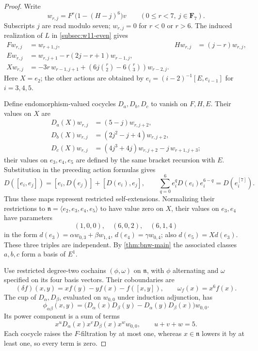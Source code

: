 \documentclass[11pt,reqno]{amsart}
\theoremstyle{definition}
\theoremstyle{remark}
\theoremstyle{definition}
\begin{document}
\begin{proof}
Write
\[
 w_{r,j}=F^r\bigl(1-(H-j)^6\bigr)v\qquad
 (0\le r<7,\ j\in\mathbf F_7).
\]
Subscripts $j$ are read modulo seven; $w_{r,j}=0$ for $r<0$ or $r>6$.
The induced realization of $L$ in \cref{subsec:w11-even} gives
\[
\begin{aligned}
 Fw_{r,j}&=w_{r+1,j},&
 Hw_{r,j}&=(j-r)w_{r,j},\\
 Ew_{r,j}&=w_{r,j+1}-r(2j-r+1)w_{r-1,j},\\
 Xw_{r,j}&=-3r\,w_{r-1,j+1}
 +\left(6j\binom r2-6\binom r3\right)w_{r-2,j}.
\end{aligned}
\]
Here $X=e_2$; the other actions are obtained by
$e_i=(i-2)^{-1}[E,e_{i-1}]$ for $i=3,4,5$.

Define endomorphism-valued cocycles $D_a,D_b,D_c$ to vanish on
$F,H,E$. Their values on $X$ are
\[
\begin{aligned}
 D_a(X)w_{r,j}&=(5-j)w_{r,j+2},\\
 D_b(X)w_{r,j}&=(2j^2-j+4)w_{r,j+2},\\
 D_c(X)w_{r,j}&=(4j^3+4j)w_{r,j+2}-j\,w_{r+1,j+3};
\end{aligned}
\]
their values on $e_3,e_4,e_5$ are defined by the same bracket recursion
with $E$. Substitution in the preceding action formulas gives
\[
 D([e_i,e_j])=[e_i,D(e_j)]+[D(e_i),e_j],\qquad
 \sum_{q=0}^6 e_i^qD(e_i)e_i^{6-q}=D(e_i^{[7]}).
\]
Thus these maps represent restricted self-extensions. Normalizing
their restrictions to $\mathfrak n=\langle e_2,e_3,e_4,e_5\rangle$
to have value zero on $X$, their values on $e_3,e_4$ have parameters
\[
 (1,0,0),\quad(6,0,2),\quad(6,1,4)
\]
in the form
$d(e_3)=\alpha w_{0,3}+\beta w_{1,4}$,
$d(e_4)=\gamma w_{0,4}$; also $d(e_5)=Xd(e_3)$.
These three triples are independent. By
\cref{thm:bnw-main} the associated classes $a,b,c$ form a basis of $E^1$.

Use restricted degree-two cochains $(\phi,\omega)$ on
$\mathfrak n$, with $\phi$ alternating and $\omega$ specified on its
four basis vectors. Their coboundaries are
\[
 (\delta f)(x,y)=x f(y)-y f(x)-f([x,y]),\qquad
 \omega_f(x)=x^6f(x).
\]
The cup of $D_\alpha,D_\beta$, evaluated on $w_{0,0}$ under
induction adjunction, has
\[
 \phi_{\alpha\beta}(x,y)=
 \bigl(D_\alpha(x)D_\beta(y)-D_\alpha(y)D_\beta(x)\bigr)w_{0,0}.
\]
Its power component is a sum of terms
\[
 x^uD_\alpha(x)x^vD_\beta(x)x^w w_{0,0},\qquad u+v+w=5.
\]
Each cocycle raises the $F$-filtration by at most one, whereas
$x\in\mathfrak n$ lowers it by at least one, so every term is zero.


\end{proof}
\end{document}
